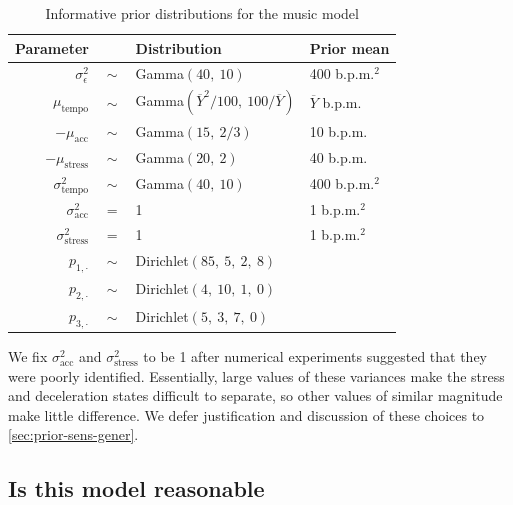 \documentclass[aoas]{imsart}
\begin{document}
\begin{table}[t]
    \caption{Informative prior distributions for the music model}
  \label{tab:priors}
  \centering
  \begin{tabular}{@{}rcll@{}}
    \toprule
    Parameter & \phantom{a} & Distribution & Prior mean\\
    \midrule
    $\sigma^2_{\epsilon}$ & $\sim$ & Gamma$(40,\ 10)$ & 400 b.p.m.$^2$\\
    $\mu_{\textrm{tempo}}$ & $\sim$ & Gamma$(\overline{Y}^2/100,\ 100
                                      /\overline{Y})$ & $\overline{Y}$
                                                        b.p.m.\\
    $-\mu_{\textrm{acc}} $ & $\sim$ & Gamma$(15,\ 2/3)$ & 10 b.p.m.\\
    $-\mu_{\textrm{stress}} $ & $\sim$ & Gamma$(20,\ 2)$ & 40 b.p.m.\\
    $\sigma^2_{\textrm{tempo}} $ & $\sim$ & Gamma$(40,\ 10)$ & 400
                                                               b.p.m.$^2$\\
    $\sigma^2_{\textrm{acc}} $ & $=$ & 1 & 1 b.p.m.$^2$\\
    $\sigma^2_{\textrm{stress}} $ & $=$ & 1 & 1 b.p.m.$^2$\\
    $p_{1,\cdot}$ & $\sim$ & Dirichlet$(85,\ 5,\ 2,\ 8)$ \\
    $p_{2,\cdot}$ & $\sim$ & Dirichlet$(4,\ 10,\ 1,\ 0)$ \\
    $p_{3,\cdot}$ & $\sim$ & Dirichlet$(5,\ 3,\ 7,\ 0)$ \\
    \bottomrule
  \end{tabular}
\end{table}
We fix $\sigma^2_{\textrm{acc}}$ and $\sigma^2_{\textrm{stress}}$ to
be 1 after numerical experiments suggested
that they were poorly identified. Essentially, large values of these
variances make the stress and deceleration states difficult to
separate, so other values of similar magnitude make little
difference. We defer justification and discussion of these choices to \autoref{sec:prior-sens-gener}.

\subsection{Is this model reasonable}
\label{sec:this-model-reas}
\end{document}
